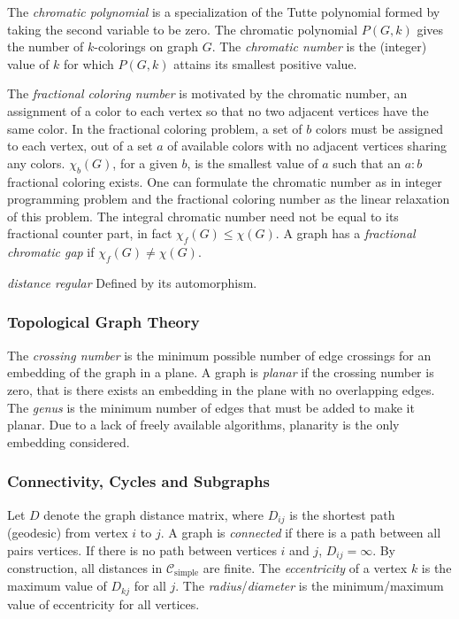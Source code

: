 \documentclass[12pt]{article}
\newcommand{\note}[1]{\todo[inline]{#1}}
\newcommand{\SIMPLECLASS}{\mathcal{C}_\text{simple}}
\begin{document}
\begin{appendices}
The \textit{chromatic polynomial} is a specialization of the Tutte polynomial formed by taking the second variable to be zero. 
The chromatic polynomial $P(G,k)$ gives the number of $k$-colorings on graph $G$. 
The \textit{chromatic number} is the (integer) value of $k$ for which $P(G,k)$ attains its smallest positive value. 
\note{What is a proper coloring?}

The \textit{fractional coloring number} is motivated by the chromatic number, an assignment of a color to each vertex so that no two adjacent vertices have the same color. 
In the fractional coloring problem, a set of $b$ colors must be assigned to each vertex, out of a set $a$ of available colors with no adjacent vertices sharing any colors.
$\chi_b(G)$, for a given $b$, is the smallest value of $a$ such that an $a:b$ fractional coloring exists. 
One can formulate the chromatic number as in integer programming problem and the fractional coloring number as the linear relaxation of this problem\cite{scheinerman2011fractional}.
The integral chromatic number need not be equal to its fractional counter part, in fact $\chi_f(G) \le \chi(G)$. 
A graph has a \textit{fractional chromatic gap} if $\chi_f(G) \ne \chi(G)$.

\textit{distance regular} Defined by its automorphism.
\note{Complete def. here}

\subsubsection*{Topological Graph Theory}

The \textit{crossing number} is the minimum possible number of edge crossings for an embedding of the graph in a plane.
A graph is \textit{planar} if the crossing number is zero, that is there exists an embedding in the plane with no overlapping edges.
The \textit{genus} is the minimum number of edges that must be added to make it planar.
Due to a lack of freely available algorithms, planarity is the only embedding considered.

\subsubsection*{Connectivity, Cycles and Subgraphs}

Let $D$ denote the graph distance matrix, where $D_{ij}$ is the shortest path (geodesic) from vertex $i$ to $j$.
A graph is \textit{connected} if there is a path between all pairs vertices.
If there is no path between vertices $i$ and $j$, $D_{ij}=\infty$.
By construction, all distances in $\SIMPLECLASS$ are finite.
The \textit{eccentricity} of a vertex $k$ is the maximum value of $D_{k j}$ for all $j$.
The \textit{radius}/\textit{diameter} is the minimum/maximum value of eccentricity for all vertices.


\end{appendices}
\end{document}
